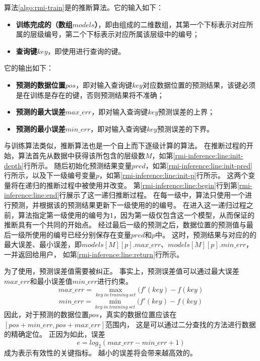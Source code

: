 算法\ref{algo:rmi-train}是{\rmi}的推断算法。它的输入如下：
\begin{itemize}
  \item \textbf{训练完成的{\rmi}（{\model}数组$models$）}，即由{\model}组成的二维数组，其第一个下标表示对应{\model}所属的层级编号，第二个下标表示对应{\model}所属该层级中的{\model}编号；
  \item \textbf{查询键$key$}，即使用{\rmi}进行查询的键。
\end{itemize}
它的输出如下：
\begin{itemize}
  \item \textbf{预测的数据位置$pos$}，即{\rmi}对输入查询键$key$对应数据位置的预测结果，该键必须是在训练是存在的键，否则预测结果将不准确；
  \item \textbf{预测的最大误差$max\_err$}，即{\rmi}对输入查询键$key$预测误差的上界；
  \item \textbf{预测的最小误差$min\_err$}，即{\rmi}对输入查询键$key$预测误差的下界。
\end{itemize}

与{\rmi}训练算法类似，{\rmi}推断算法也是一个自上而下逐级计算的算法。
在推断过程的开始，算法首先从{\model}数据中获得该{\rmi}所包含的层级数$M$，如第\ref{rmi-inference:line:init-depth}行所示。
随后初始化预测结果变量$pred$，如第\ref{rmi-inference:line:init-pred}行所示，以及下一级{\model}编号变量$p$，如第\ref{rmi-inference:line:init-p}行所示。
这两个变量将在递归的推断过程中被使用并改变。
第\ref{rmi-inference:line:begin}行到第\ref{rmi-inference:line:end}行展示了这一递归推断过程。
在每一级中，算法只使用一个{\model}进行预测，并根据该{\model}的预测结果更新下一级使用的{\model}的编号。
在进入这一递归过程之前，算法指定第一级使用的{\model}编号为1，因为第一级仅包含这一个模型，从而保证{\rmi}的推断具有一个共同的开始点。
经过最后一级的{\model}预测之后，数据位置的预测值与最后一级所使用的{\model}编号已经分别保存在变量$pred$和$p$中。
这时，预测结果与对应的{\model}的最大误差、最小误差，即$models[M][p].max\_err$、$models[M][p].min\_err$，一并返回给用户，
如第\ref{rmi-inference:line:return}行所示。

为了使用{\rmi}，预测误差值需要被纠正。
事实上，预测误差值可以通过最大误差$max\_err$和最小误差值$min\_err$进行约束。
\[ max\_err = \max_{key\ in\ training\ set}(f'(key)-f(key) \]
\[ min\_err = \min_{key\ in\ training\ set}(f'(key)-f(key) \]
因此，对于{\rmi}预测的数据位置$pos$，真实的数据位置应该在$[pos + min\_err, pos + max\_err]$范围内，
这是可以通过二分查找的方法进行数据的精确定位。
正因为如此，{\model}误差
$$e = log_2(max\_err - min\_err + 1)$$
成为表示{\rmi}有效性的关键指标。
越小的{\model}误差将会带来越高效的{\rmi}。

